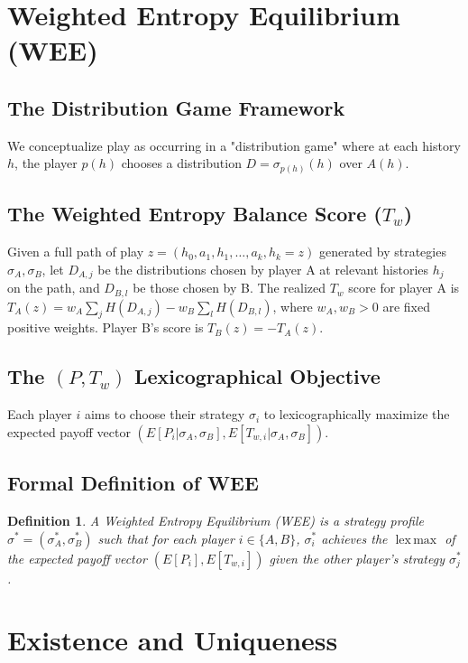 \documentclass{article}
\newtheorem{definition}[theorem]{Definition}
\DeclareMathOperator*{\lexmax}{lex\,max}
\begin{document}
\section{Weighted Entropy Equilibrium (WEE)}

\subsection{The Distribution Game Framework}
We conceptualize play as occurring in a "distribution game" where at each history $h$, the player $p(h)$ chooses a distribution $D = \sigma_{p(h)}(h)$ over $A(h)$.

\subsection{The Weighted Entropy Balance Score (\texorpdfstring{$T_w$}{Tw})}
Given a full path of play $z = (h_0, a_1, h_1, \dots, a_k, h_k=z)$ generated by strategies $\sigma_A, \sigma_B$, let $D_{A,j}$ be the distributions chosen by player A at relevant histories $h_j$ on the path, and $D_{B,l}$ be those chosen by B. The realized $T_w$ score for player A is $T_A(z) = w_A \sum_j H(D_{A,j}) - w_B \sum_l H(D_{B,l})$, where $w_A, w_B > 0$ are fixed positive weights. Player B's score is $T_B(z) = -T_A(z)$.

\subsection{The \texorpdfstring{$(P, T_w)$}{(P, Tw)} Lexicographical Objective}
Each player $i$ aims to choose their strategy $\sigma_i$ to lexicographically maximize the expected payoff vector $(E[P_i | \sigma_A, \sigma_B], E[T_{w,i} | \sigma_A, \sigma_B])$.

\subsection{Formal Definition of WEE}
\begin{definition}
A \emph{Weighted Entropy Equilibrium (WEE)} is a strategy profile $\sigma^* = (\sigma_A^*, \sigma_B^*)$ such that for each player $i \in \{A, B\}$, $\sigma_i^*$ achieves the $\lexmax$ of the expected payoff vector $(E[P_i], E[T_{w,i}])$ given the other player's strategy $\sigma_j^*$.
\end{definition}

\section{Existence and Uniqueness}
\end{document}
